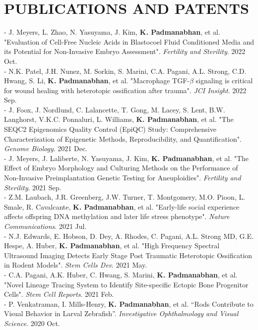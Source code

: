 \documentclass[11pt,letterpaper,sans]{moderncv}        %
\begin{document}
{{{\section{PUBLICATIONS AND PATENTS}
\begin{minipage}{\maincolumnwidth}%
	\small{
	- J. Meyers, L. Zhao, N. Yasuyama, J. Kim, \textbf{K. Padmanabhan}, et al. "Evaluation of Cell-Free Nucleic Acids in Blastocoel Fluid Conditioned Media and its Potential for Non-Invasive Embryo Assessment". \textit{Fertility and Sterility}. 2022 Oct.\\
	- N.K. Patel, J.H. Nunez, M. Sorkin, S. Marini, C.A. Pagani, A.L. Strong, C.D. Hwang, S. Li, \textbf{K. Padmanabhan}, et al. "Macrophage TGF-$\beta$ signaling is critical for wound healing with heterotopic ossification after trauma".  \textit{JCI Insight}. 2022 Sep.\\
	- J. Foox, J. Nordlund, C. Lalancette, T. Gong, M. Lacey, S. Lent, B.W. Langhorst, V.K.C. Ponnaluri, L. Williams, \textbf{K. Padmanabhan}, et al. "The SEQC2 Epigenomics Quality Control (EpiQC) Study: Comprehensive Characterization of Epigenetic Methods, Reproducibility, and Quantification".  \textit{Genome Biology}. 2021 Dec.\\
	- J. Meyers, J. Laliberte, N. Yasuyama, J. Kim, \textbf{K. Padmanabhan}, et al. "The Effect of Embryo Morphology and Culturing Methods on the Performance of Non-Invasive Preimplantation Genetic Testing for Aneuploidies". \textit{Fertility and Sterility}. 2021 Sep.\\
	- Z.M. Laubach, J.R. Greenberg, J.W. Turner, T. Montgomery, M.O. Pioon, L. Smale, R. Cavalcante, \textbf{K. Padmanabhan}, et al. "Early-life social experience affects offspring DNA methylation and later life stress phenotype". \textit{Nature Communications}. 2021 Jul.\\
	- N.J. Edwards, E. Hobson, D. Dey, A. Rhodes, C. Pagani, A.L. Strong MD, G.E. Hespe, A. Huber, \textbf{K. Padmanabhan}, et al. "High Frequency Spectral Ultrasound Imaging Detects Early Stage Post Traumatic Heterotopic Ossification in Rodent Models". \textit{Stem Cells Dev}. 2021 May.\\
	- C.A. Pagani, A.K. Huber, C. Hwang, S. Marini, \textbf{K. Padmanabhan}, et al. "Novel Lineage Tracing System to Identify Site-specific Ectopic Bone Progenitor Cells". \textit{Stem Cell Reports}. 2021 Feb.\\
          - P. Venkatraman, I. Mills-Henry, \textbf{K. Padmanabhan}, et al. “Rods Contribute to Visual Behavior in Larval Zebrafish”. \textit{Investigative Ophthalmology and Visual Science}. 2020 Oct.\\
}
\end{minipage}}}}
\end{document}
